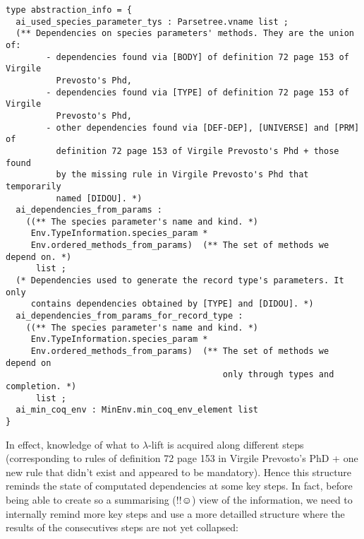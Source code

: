 {\footnotesize
\begin{lstlisting}[language=MyOCaml]
type abstraction_info = {
  ai_used_species_parameter_tys : Parsetree.vname list ;
  (** Dependencies on species parameters' methods. They are the union of:
        - dependencies found via [BODY] of definition 72 page 153 of Virgile
          Prevosto's Phd,
        - dependencies found via [TYPE] of definition 72 page 153 of Virgile
          Prevosto's Phd,
        - other dependencies found via [DEF-DEP], [UNIVERSE] and [PRM] of
          definition 72 page 153 of Virgile Prevosto's Phd + those found
          by the missing rule in Virgile Prevosto's Phd that temporarily
          named [DIDOU]. *)
  ai_dependencies_from_params :
    ((** The species parameter's name and kind. *)
     Env.TypeInformation.species_param *
     Env.ordered_methods_from_params)  (** The set of methods we depend on. *)
      list ;
  (* Dependencies used to generate the record type's parameters. It only
     contains dependencies obtained by [TYPE] and [DIDOU]. *)
  ai_dependencies_from_params_for_record_type :
    ((** The species parameter's name and kind. *)
     Env.TypeInformation.species_param *
     Env.ordered_methods_from_params)  (** The set of methods we depend on
                                           only through types and completion. *)
      list ;
  ai_min_coq_env : MinEnv.min_coq_env_element list
}
\end{lstlisting}
}

In effect, knowledge of what to $\lambda$-lift is acquired along
different steps (corresponding to rules of definition 72 page 153 in
Virgile Prevosto's PhD + one new rule that didn't exist and appeared
to be mandatory). Hence this structure reminds the state of computated
dependencies at some key steps. In fact, before being able to create
so a summarising (!!$\smiley$) view of the information, we need to
internally remind more key steps and use a more detailled structure
where the results of the consecutives steps are not yet collapsed:

